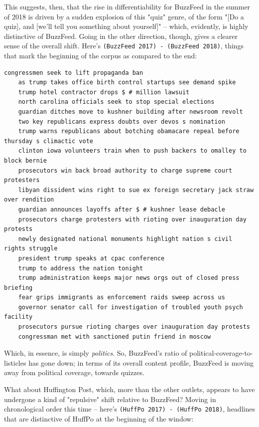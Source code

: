 \documentclass{scrartcl}
\begin{document}
This suggests, then, that the rise in differentiability for BuzzFeed in the summer of 2018 is driven by a sudden explosion of this "quiz" genre, of the form "[Do a quiz], and [we'll tell you something about yourself]" -- which, evidently, is highly distinctive of BuzzFeed. Going in the other direction, though, gives a clearer sense of the overall shift. Here's \texttt{(BuzzFeed 2017) - (BuzzFeed 2018)}, things that mark the beginning of the corpus as compared to the end:

\begin{lstlisting}[basicstyle=\tiny\hlfont]
    congressmen seek to lift propaganda ban
    as trump takes office birth control startups see demand spike
    trump hotel contractor drops $ # million lawsuit
    north carolina officials seek to stop special elections
    guardian ditches move to kushner building after newsroom revolt
    two key republicans express doubts over devos s nomination
    trump warns republicans about botching obamacare repeal before thursday s climactic vote
    clinton iowa volunteers train when to push backers to omalley to block bernie
    prosecutors win back broad authority to charge supreme court protesters
    libyan dissident wins right to sue ex foreign secretary jack straw over rendition
    guardian announces layoffs after $ # kushner lease debacle
    prosecutors charge protesters with rioting over inauguration day protests
    newly designated national monuments highlight nation s civil rights struggle
    president trump speaks at cpac conference
    trump to address the nation tonight
    trump administration keeps major news orgs out of closed press briefing
    fear grips immigrants as enforcement raids sweep across us
    governor senator call for investigation of troubled youth psych facility
    prosecutors pursue rioting charges over inauguration day protests
    congressman met with sanctioned putin friend in moscow
\end{lstlisting}

Which, in essence, is simply \textit{politics}. So, BuzzFeed's ratio of political-coverage-to-listicles has gone down; in terms of its overall content profile, BuzzFeed is moving away from political coverage, towards quizzes.

What about Huffington Post, which, more than the other outlets, appears to have undergone a kind of "repulsive" shift relative to BuzzFeed? Moving in chronological order this time -- here's \texttt{(HuffPo 2017) - (HuffPo 2018)}, headlines that are distinctive of HuffPo at the beginning of the window:
\end{document}
